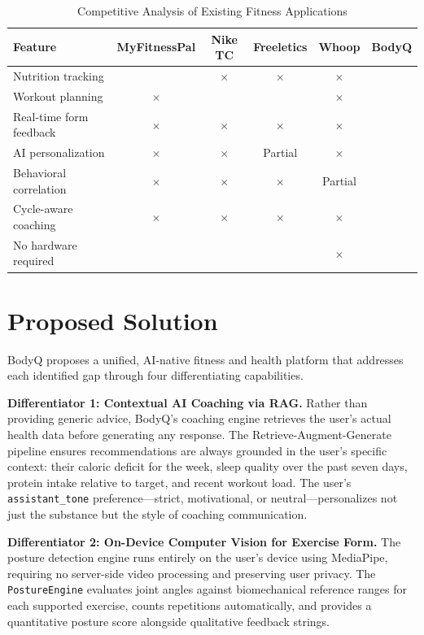 \begin{table}[H]
	\centering
	\caption{Competitive Analysis of Existing Fitness Applications}
	\label{tab:comparison}
	\begin{tabularx}{\textwidth}{Xccccc}
		\toprule
		\textbf{Feature} & \textbf{MyFitnessPal} & \textbf{Nike TC}
		& \textbf{Freeletics} & \textbf{Whoop} & \textbf{BodyQ} \\
		\midrule
		Nutrition tracking      & \checkmark & $\times$   & $\times$   & $\times$   & \checkmark \\
		Workout planning        & $\times$   & \checkmark & \checkmark & $\times$   & \checkmark \\
		Real-time form feedback & $\times$   & $\times$   & $\times$   & $\times$   & \checkmark \\
		AI personalization      & $\times$   & $\times$   & Partial    & $\times$   & \checkmark \\
		Behavioral correlation  & $\times$   & $\times$   & $\times$   & Partial    & \checkmark \\
		Cycle-aware coaching    & $\times$   & $\times$   & $\times$   & $\times$   & \checkmark \\
		No hardware required    & \checkmark & \checkmark & \checkmark & $\times$   & \checkmark \\
		\bottomrule
	\end{tabularx}
\end{table}

\section{Proposed Solution}
BodyQ proposes a unified, AI-native fitness and health platform that
addresses each identified gap through four differentiating capabilities.

\textbf{Differentiator 1: Contextual AI Coaching via RAG.}
Rather than providing generic advice, BodyQ's coaching engine retrieves
the user's actual health data before generating any response. The
Retrieve-Augment-Generate pipeline ensures recommendations are always
grounded in the user's specific context: their caloric deficit for the
week, sleep quality over the past seven days, protein intake relative to
target, and recent workout load. The user's \texttt{assistant\_tone}
preference---strict, motivational, or neutral---personalizes not just
the substance but the style of coaching communication.

\textbf{Differentiator 2: On-Device Computer Vision for Exercise Form.}
The posture detection engine runs entirely on the user's device using
MediaPipe, requiring no server-side video processing and preserving user
privacy. The \texttt{PostureEngine} evaluates joint angles against
biomechanical reference ranges for each supported exercise, counts
repetitions automatically, and provides a quantitative posture score
alongside qualitative feedback strings.

